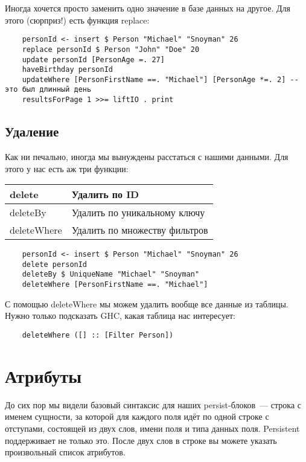Иногда хочется просто заменить одно значение в базе данных на другое. Для этого
(сюрприз!) есть функция replace:

\begin{lstlisting}
    personId <- insert $ Person "Michael" "Snoyman" 26
    replace personId $ Person "John" "Doe" 20
    update personId [PersonAge =. 27]
    haveBirthday personId
    updateWhere [PersonFirstName ==. "Michael"] [PersonAge *=. 2] -- это был длинный день
    resultsForPage 1 >>= liftIO . print
\end{lstlisting}

\subsection{Удаление}

Как ни печально, иногда мы вынуждены расстаться с нашими данными. Для этого у
нас есть аж три функции:

\begin{center}
\begin{tabular}{ | l | l |}
\hline
delete & Удалить по ID \\ \hline
deleteBy & Удалить по уникальному ключу \\ \hline
deleteWhere & Удалить по множеству фильтров \\ \hline
\end{tabular}
\end{center}

\begin{lstlisting}
    personId <- insert $ Person "Michael" "Snoyman" 26
    delete personId
    deleteBy $ UniqueName "Michael" "Snoyman"
    deleteWhere [PersonFirstName ==. "Michael"]
\end{lstlisting}

С помощью deleteWhere мы можем удалить вообще все данные из таблицы. Нужно
только подсказать GHC, какая таблица нас интересует:

\begin{lstlisting}
    deleteWhere ([] :: [Filter Person])
\end{lstlisting}

\section{Атрибуты}

До сих пор мы видели базовый синтаксис для наших persist-блоков~--- строка с
именем сущности, за которой для каждого поля идёт по одной строке с отступами,
состоящей из двух слов, имени поля и типа данных поля. Persistent поддерживает
не только это. После двух слов в строке вы можете указать произвольный список
атрибутов.

